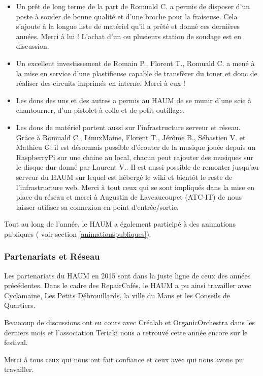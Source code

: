 \documentclass[a4paper, 11pt]{article}
\begin{document}
\begin{itemize}
	\item Un prêt de long terme de la part de Romuald C. a permis de disposer d'un poste à souder de bonne qualité et
		d'une broche pour la fraiseuse. Cela s'ajoute à la longue liste de matériel qu'il a prêté et donné ces dernières
		années. Merci à lui ! L'achat d'un ou plusieurs station de soudage est en discussion.
	\item Un excellent investissement de Romain P., Florent T., Romuald C. a mené à la mise en service d'une plastifieuse
		capable de transfèrer du toner et donc de réaliser des circuits imprimés en interne. Merci à eux !
	\item Les dons des uns et des autres a permis au HAUM de se munir d'une scie à chantourner, d'un pistolet à colle et
		de petit outillage.
	\item Les dons de matériel portent aussi sur l'infrastructure serveur et réseau. Grâce à Romuald C., LinuxMaine,
		Florent T., Jérôme B., Sébastien V. et Mathieu G. il est désormais possible d'écouter de la musique jouée depuis un
		RaspberryPi sur une chaine au local, chacun peut rajouter des musiques sur le disque dur donné par Laurent
		V.. Il est aussi possible de remonter jusqu'au serveur du HAUM sur lequel est hébergé le wiki et bientôt le
		reste de l'infrastructure web. Merci à tout ceux qui se sont impliqués dans la mise en place du réseau et merci
		à Augustin de Laveaucoupet (ATC-IT) de nous laisser utiliser sa connexion en point d'entrée/sortie.
\end{itemize}

Tout au long de l'année, le HAUM a également participé à des animations publiques ( voir section \ref{animationspubliques}).


\subsubsection{Partenariats et Réseau}

Les partenariats du HAUM en 2015 sont dans la juste ligne de ceux des années précédentes. Dans le cadre des
RepairCafés, le HAUM a pu ainsi travailler avec Cyclamaine, Les Petits Débrouillards, la ville du Mans et les Conseils de Quartiers.

Beaucoup de discussions ont eu cours avec Créalab et OrganicOrchestra dans les derniers mois et l'association Teriaki
nous a retrouvé cette année encore sur le festival.

Merci à tous ceux qui nous ont fait confiance et ceux avec qui nous avons pu travailler.
\end{document}

